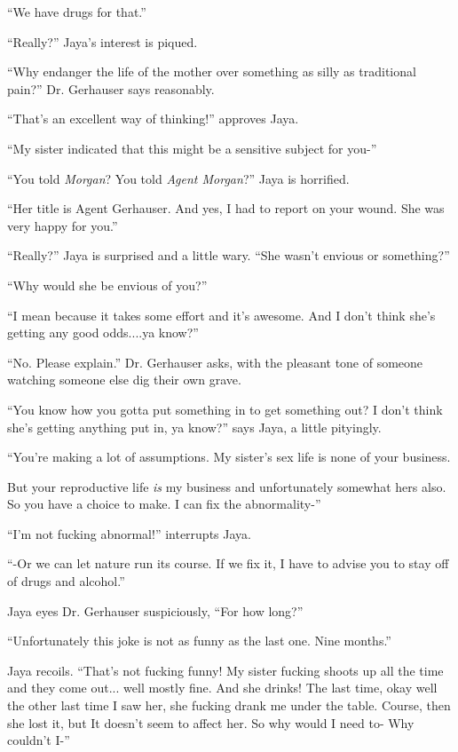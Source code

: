 ``We have drugs for that.''

``Really?''  Jaya's interest is piqued.

``Why endanger the life of the mother over something as silly as traditional pain?'' Dr. Gerhauser says reasonably.

``That's an excellent way of thinking!'' approves Jaya.

``My sister indicated that this might be a sensitive subject for you-''

``You told \textit{Morgan}?  You told \textit{Agent Morgan}?'' Jaya is horrified.

``Her title is Agent Gerhauser. And yes, I had to report on your wound.  She was very happy for you.''

``Really?'' Jaya is surprised and a little wary. ``She wasn't envious or something?''

``Why would she be envious of you?''

``I mean because it takes some effort and it's awesome. And I don't think she's getting any good odds....ya know?''

``No.  Please explain.'' Dr. Gerhauser asks, with the pleasant tone of someone watching someone else dig their own grave.

``You know how you gotta put something in to get something out?  I don't think she's getting anything put in, ya know?'' says Jaya, a little pityingly.

``You're making a lot of assumptions.  My sister's sex life is none of your business.

But your reproductive life \textit{is} my business and unfortunately somewhat hers also.  So you have a choice to make. I can fix the abnormality-''

``I'm not fucking abnormal!'' interrupts Jaya.

``-Or we can let nature run its course.  If we fix it, I have to advise you to stay off of drugs and alcohol.''

Jaya eyes Dr. Gerhauser suspiciously, ``For how long?''

``Unfortunately this joke is not as funny as the last one.  Nine months.''

Jaya recoils.  ``That's not fucking funny!  My sister fucking shoots up all the time and they come out... well mostly fine.  And she drinks!  The last time, okay well the other last time I saw her, she fucking drank me under the table.  Course, then she lost it, but It doesn't seem to affect her.  So why would I need to- Why couldn't I-''

